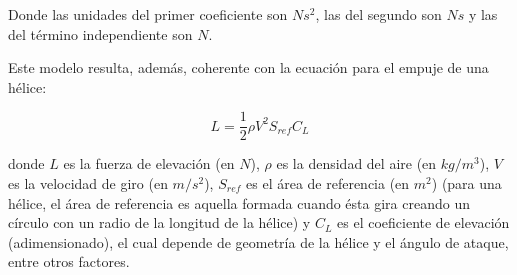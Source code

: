 \documentclass[spanish,12pt,a4paper,titlepage]{report}
\begin{document}
Donde las unidades del primer coeficiente son $Ns^2$, las del segundo son $Ns$ y las del término independiente son $N$.

Este modelo resulta, además, coherente con la ecuación para el empuje de una hélice:

\begin{equation}
L=\frac{1}{2}\rho V^2S_{ref}C_L
\end{equation}

donde $L$ es la fuerza de elevación (en $N$), $\rho$ es la densidad del aire (en $kg/m^3$), $V$ es la velocidad de giro (en $m/s^2$), $S_{ref}$ es el área de referencia (en $m^2$) (para  una  hélice,  el  área  de  referencia  es  aquella  formada  cuando ésta gira creando un círculo con un radio de la longitud de la hélice) y $C_L$ es el coeficiente de elevación (adimensionado), el cual depende de geometría de la hélice y el ángulo de ataque, entre otros factores.
\end{document}
